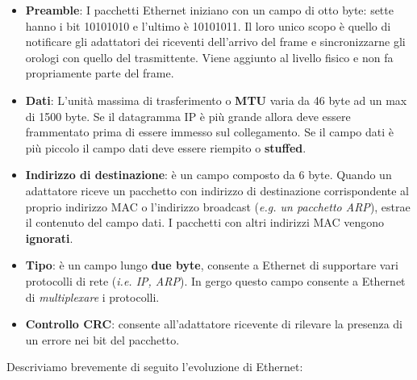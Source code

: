 \documentclass[11pt,a4paper,oneside]{book}
\theoremstyle{definition}
\begin{document}
\begin{itemize}
	\item \textbf{Preamble}: I pacchetti Ethernet iniziano con un campo di otto byte: sette hanno i bit 10101010 e l’ultimo è 10101011. Il loro unico scopo è quello di notificare gli adattatori dei riceventi dell'arrivo del frame e sincronizzarne gli orologi con quello del trasmittente. Viene aggiunto al livello fisico e non fa propriamente parte del frame.
	\item \textbf{Dati}: L’unità massima di trasferimento o \textbf{MTU} varia da 46 byte ad un max di 1500 byte. Se il datagramma IP è più grande allora deve essere
	      frammentato prima di essere immesso sul collegamento. Se il campo dati è più piccolo il campo dati deve essere riempito o \textbf{stuffed}.
	\item \textbf{Indirizzo di destinazione}: è un campo composto da 6 byte.  Quando un adattatore riceve un pacchetto con indirizzo di
	      destinazione corrispondente al proprio indirizzo MAC o
	      l’indirizzo broadcast (\textit{e.g. un pacchetto ARP}), estrae il
	      contenuto del campo dati. I pacchetti con altri indirizzi MAC vengono \textbf{ignorati}.
	\item \textbf{Tipo}: è un campo lungo \textbf{due byte}, consente a Ethernet di supportare vari protocolli di rete (\textit{i.e. IP, ARP}). In gergo questo campo consente a Ethernet di \textit{multiplexare} i protocolli.
	\item \textbf{Controllo CRC}: consente all’adattatore ricevente di rilevare la
	      presenza di un errore nei bit del pacchetto.
\end{itemize}

\pagebreak

Descriviamo brevemente di seguito l'evoluzione di Ethernet:
\end{document}
